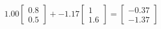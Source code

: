 \documentclass[preview]{standalone}
\begin{document}
\begin{align*}
1.00 \begin{bmatrix} 0.8 \\ 0.5 \end{bmatrix} + -1.17 \begin{bmatrix} 1 \\ 1.6 \end{bmatrix} = \begin{bmatrix} -0.37 \\ -1.37 \end{bmatrix}
\end{align*}
\end{document}
